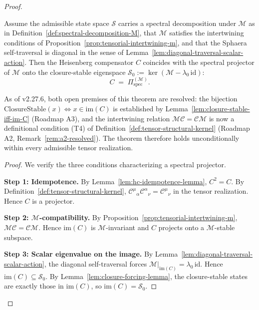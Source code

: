 \begin{proof}
\begin{theorem}
\label{thm:hc-spectral-projector}
Assume the admissible state space $\mathcal{S}$ carries a spectral
decomposition under $\mathcal{M}$ as in
Definition~\ref{def:spectral-decomposition-M}, that $\mathcal{M}$ satisfies
the intertwining conditions of Proposition~\ref{prop:tensorial-intertwining-m},
and that the Sphaera self-traversal is diagonal in the sense of
Lemma~\ref{lem:diagonal-traversal-scalar-action}. Then the Heisenberg
compensator $C$ coincides with the spectral projector of $\mathcal{M}$
onto the closure-stable eigenspace $\mathcal{S}_0 :=
\ker(\mathcal{M} - \lambda_0\,\mathrm{id})$:
\[
  C \;=\; \Pi^{(\mathcal{M})}_{\mathrm{spec}}.
\]
\end{theorem}

\begin{remark}
\label{rem:hc-spectral-projector-conditional}
As of v2.27.6, both open premises of this theorem are resolved:
the bijection $\mathrm{ClosureStable}(x)\Leftrightarrow x\in\mathrm{im}(C)$
is established by Lemma~\ref{lem:closure-stable-iff-im-C} (Roadmap A3),
and the intertwining relation $\mathcal{M}\mathcal{C}=\mathcal{C}\mathcal{M}$
is now a definitional condition (T4) of
Definition~\ref{def:tensor-structural-kernel} (Roadmap A2,
Remark~\ref{rem:a2-resolved}).
The theorem therefore holds unconditionally within every admissible
tensor realization.
\end{remark}

\begin{proof}
We verify the three conditions characterizing a spectral projector.

\smallskip
\noindent\textbf{Step 1: Idempotence.}
By Lemma~\ref{lem:hc-idempotence-lemma}, $C^2=C$. By
Definition~\ref{def:tensor-structural-kernel},
$\mathcal{C}^\mu{}_\alpha\mathcal{C}^\alpha{}_\nu = \mathcal{C}^\mu{}_\nu$
in the tensor realization. Hence $C$ is a projector.

\smallskip
\noindent\textbf{Step 2: $\mathcal{M}$-compatibility.}
By Proposition~\ref{prop:tensorial-intertwining-m},
$\mathcal{M}\mathcal{C} = \mathcal{C}\mathcal{M}$. Hence $\mathrm{im}(C)$
is $\mathcal{M}$-invariant and $C$ projects onto a $\mathcal{M}$-stable
subspace.

\smallskip
\noindent\textbf{Step 3: Scalar eigenvalue on the image.}
By Lemma~\ref{lem:diagonal-traversal-scalar-action}, the diagonal
self-traversal forces $\mathcal{M}|_{\mathrm{im}(C)} = \lambda_0\,\mathrm{id}$.
Hence $\mathrm{im}(C) \subseteq \mathcal{S}_0$.
By Lemma~\ref{lem:closure-forcing-lemma}, the closure-stable states are
exactly those in $\mathrm{im}(C)$, so $\mathrm{im}(C) = \mathcal{S}_0$.


\end{proof}
\end{proof}
